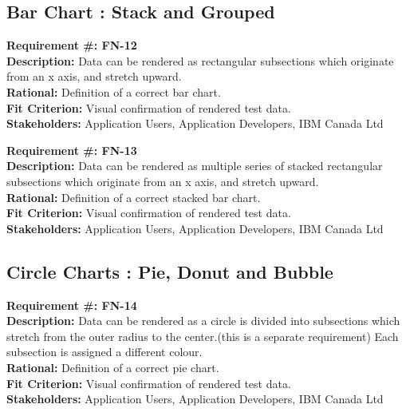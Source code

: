 \documentclass[12pt, titlepage]{article}
\begin{document}
\subsection{Bar Chart : Stack and Grouped}
\begin{flushleft}
\textbf{Requirement \#: FN-12} \\
\textbf{Description:} Data can be rendered as rectangular subsections which originate from an x axis, and stretch upward.  \\
\textbf{Rational:} Definition of a correct bar chart. \\
\textbf{Fit Criterion:} Visual confirmation of rendered test data. \\
\textbf{Stakeholders:} Application Users, Application Developers, IBM Canada Ltd\\
\end{flushleft}
\begin{flushleft}
\textbf{Requirement \#: FN-13} \\
\textbf{Description:} Data can be rendered as multiple series of stacked rectangular subsections which originate from an x axis, and stretch upward.  \\
\textbf{Rational:} Definition of a correct stacked bar chart. \\
\textbf{Fit Criterion:} Visual confirmation of rendered test data. \\
\textbf{Stakeholders:} Application Users, Application Developers, IBM Canada Ltd\\
\end{flushleft}

\subsection{Circle Charts : Pie, Donut and Bubble}
\begin{flushleft}
\textbf{Requirement \#: FN-14} \\
\textbf{Description:} Data can be rendered as a circle is divided into subsections which stretch from the outer radius to the center.(this is a separate requirement) Each subsection is assigned a different colour. \\
\textbf{Rational:} Definition of a correct pie chart. \\
\textbf{Fit Criterion:} Visual confirmation of rendered test data. \\
\textbf{Stakeholders:} Application Users, Application Developers, IBM Canada Ltd\\
\end{flushleft}
\end{document}
